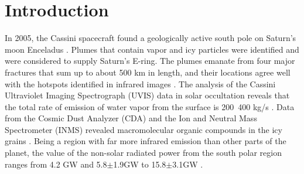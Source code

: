 \documentclass[draft]{agujournal2019}
\begin{document}
%
%

%


%
%
%
%

\section{Introduction}
In 2005, the Cassini spacecraft found a geologically active south pole on Saturn’s moon Enceladus \cite{porco2006cassini}. Plumes that contain vapor and icy particles were identified and were considered to supply Saturn’s E-ring. The plumes emanate from four major fractures that sum up to about 500 km in length, and their locations agree well with the hotspots identified in infrared images \cite{spitale2007association}. The analysis of the Cassini Ultraviolet Imaging Spectrograph (UVIS) data in solar occultation reveals that the total rate of emission of water vapor from the surface is 200~400 kg/s \cite{hansen2011composition, hansen2017investigation}. Data from the Cosmic Dust Analyzer (CDA) and the Ion and Neutral Mass Spectrometer (INMS) revealed macromolecular organic compounds in the icy grains \cite{postberg2018macromolecular}. Being a region with far more infrared emission than other parts of the planet, the value of the non-solar radiated power from the south polar region ranges from 4.2 GW \cite{spencer2013enceladus} and 5.8$\pm$1.9GW \cite{spencer2006cassini} to 15.8$\pm$3.1GW \cite{howett2011high}.
\end{document}
